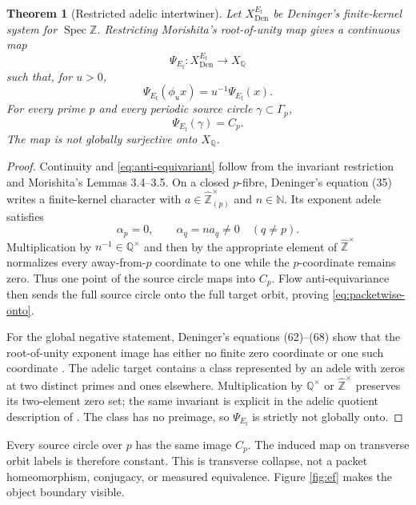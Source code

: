 \documentclass[11pt,a4paper]{article}
\newtheorem{theorem}{Theorem}[section]
\theoremstyle{definition}
\newcommand{\N}{\mathbb N}
\newcommand{\Z}{\mathbb Z}
\newcommand{\Q}{\mathbb Q}
\newcommand{\Spec}{\operatorname{Spec}}
\newcommand{\whZ}{\widehat{\Z}}
\newcommand{\Ef}{E_{\mathrm f}}
\begin{document}
\begin{theorem}[Restricted adelic intertwiner]
\label{thm:ef}
Let $X_{\mathrm{Den}}^{\Ef}$ be Deninger's finite-kernel system for
$\Spec\Z$.  Restricting Morishita's root-of-unity map gives a continuous map
\[
 \Psi_{\Ef}:X_{\mathrm{Den}}^{\Ef}\longrightarrow X_{\Q}
\]
such that, for $u>0$,
\begin{equation}
 \Psi_{\Ef}(\phi_u x)=u^{-1}\Psi_{\Ef}(x).
 \label{eq:anti-equivariant}
\end{equation}
For every prime $p$ and every periodic source circle
$\gamma\subset\Gamma_p$,
\begin{equation}
 \Psi_{\Ef}(\gamma)=C_p.
 \label{eq:packetwise-onto}
\end{equation}
The map is not globally surjective onto $X_{\Q}$.
\end{theorem}

\begin{proof}
Continuity and \eqref{eq:anti-equivariant} follow from the invariant
restriction and Morishita's Lemmas 3.4--3.5.  On a closed $p$-fibre,
Deninger's equation (35) writes a finite-kernel character with
$a\in\whZ_{(p)}^\times$ and $n\in\N$.  Its exponent adele satisfies
\begin{equation}
 \alpha_p=0,
 \qquad \alpha_q=na_q\neq0\quad(q\neq p).
 \label{eq:away-coordinates}
\end{equation}
Multiplication by $n^{-1}\in\Q^\times$ and then by the appropriate element of
$\whZ^\times$ normalizes every away-from-$p$ coordinate to one while the
$p$-coordinate remains zero.  Thus one point of the source circle maps into
$C_p$.  Flow anti-equivariance then sends the full source circle onto the
full target orbit, proving \eqref{eq:packetwise-onto}.

For the global negative statement, Deninger's equations (62)--(68) show that
the root-of-unity exponent image has either no finite zero coordinate or one
such coordinate \citep[equations (62)--(68)]{Deninger2026}.  The adelic
target contains a class represented by an adele with zeros at two distinct
primes and ones elsewhere.  Multiplication by $\Q^\times$ or
$\whZ^\times$ preserves its two-element zero set; the same invariant is
explicit in the adelic quotient description of \citet[equation (2)]{ConnesConsani2025}.
The class has no preimage, so $\Psi_{\Ef}$ is strictly not globally onto.
\end{proof}

Every source circle over $p$ has the same image $C_p$.  The induced map on
transverse orbit labels is therefore constant.  This is transverse collapse,
not a packet homeomorphism, conjugacy, or measured equivalence.  Figure
\ref{fig:ef} makes the object boundary visible.
\end{document}
